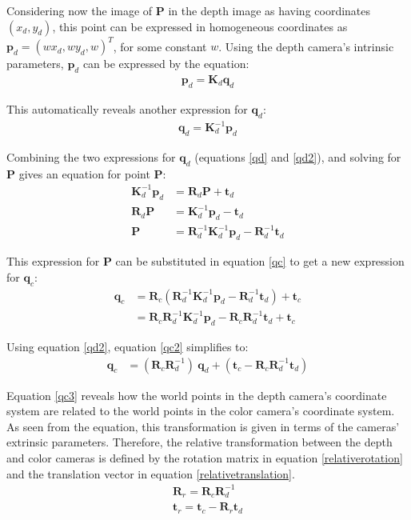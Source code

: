 Considering now the image of $\mathbf{P}$ in the depth image as having coordinates $(x_d, y_d)$, this
point can be expressed in homogeneous coordinates as $\mathbf{p}_d = (w x_d, w y_d, w )^T$, for some 
constant $w$. Using the depth camera's intrinsic parameters, $\mathbf{p}_d$ can be expressed by the 
equation:
\begin{align}
	\mathbf{p}_d = \mathbf{K}_d \mathbf{q}_d \label{pd}
\end{align}

This automatically reveals another expression for $\mathbf{q}_d$:
\begin{align}
	\mathbf{q}_d  = \mathbf{K}_{d}^{-1} \mathbf{p}_d \label{qd2}
\end{align}

Combining the two expressions for $\mathbf{q}_d$ (equations \eqref{qd} and \eqref{qd2}), and solving for 
$\mathbf{P}$ gives an equation for point $\mathbf{P}$:
\begin{align}
	\mathbf{K}_{d}^{-1} \mathbf{p}_d &= \mathbf{R}_d \mathbf{P} + \mathbf{t}_d \nonumber \\
	\mathbf{R}_d \mathbf{P} &= \mathbf{K}_{d}^{-1} \mathbf{p}_d - \mathbf{t}_d  \nonumber \\
	\mathbf{P} &= \mathbf{R}_{d}^{-1} \mathbf{K}_{d}^{-1} \mathbf{p}_d - \mathbf{R}_{d}^{-1} \mathbf{t}_d  
\end{align}

This expression for $\mathbf{P}$ can be substituted in equation \eqref{qc} to get a new expression for 
$\mathbf{q}_c$:
\begin{align}
	\mathbf{q}_c &= \mathbf{R}_c (\mathbf{R}_{d}^{-1} \mathbf{K}_{d}^{-1} \mathbf{p}_d 
					- \mathbf{R}_{d}^{-1} \mathbf{t}_d  ) + \mathbf{t}_c \nonumber \\
			    & =  \mathbf{R}_c \mathbf{R}_{d}^{-1} \mathbf{K}_{d}^{-1} \mathbf{p}_d
			    		 - \mathbf{R}_c \mathbf{R}_{d}^{-1} \mathbf{t}_d + \mathbf{t}_c \label{qc2}
\end{align}

Using equation \eqref{qd2}, equation \eqref{qc2} simplifies to:
\begin{align}
	\mathbf{q}_c &=  (\mathbf{R}_c \mathbf{R}_{d}^{-1}) ~ \mathbf{q}_{d}  
		+ (\mathbf{t}_c - \mathbf{R}_c \mathbf{R}_{d}^{-1} \mathbf{t}_d) \label{qc3}
\end{align}

Equation \eqref{qc3} reveals how the world points in the depth camera's coordinate system are related to 
the world points in the color camera's coordinate system. As seen from the equation, this
transformation is given in terms of the cameras' extrinsic parameters. Therefore, the relative transformation
between the depth and color cameras is defined by the rotation matrix in equation \eqref{relativerotation}
and the translation vector in equation \eqref{relativetranslation}.
\begin{align}
	\mathbf{R}_r = \mathbf{R}_c \mathbf{R}_{d}^{-1} \label{relativerotation} \\
	\mathbf{t}_r = \mathbf{t}_c - \mathbf{R}_r \mathbf{t}_d \label{relativetranslation}
\end{align}

